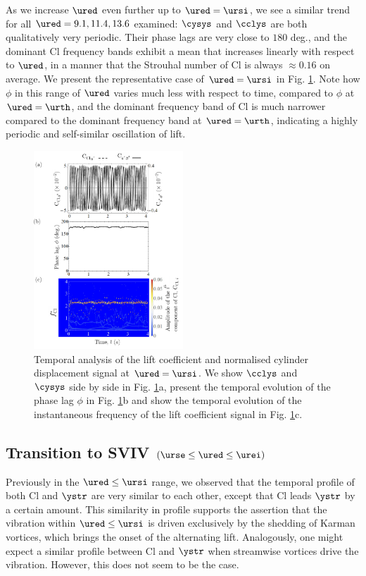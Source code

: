 \documentclass[a4paper,fleqn]{cas-sc}
\begin{document}
As we increase $\ured$ even further up to $\ured = \ursi$, we see a similar trend for all $\ured = 9.1, 11.4, 13.6$ examined: $\cysys$ and $\cclys$ are both qualitatively very periodic. Their phase lags are very close to $180$ deg., and the dominant Cl frequency bands exhibit a mean that increases linearly with respect to $\ured$, in a manner that the Strouhal number of Cl is always $\approx 0.16$ on average. We present the representative case of $\ured = \ursi$ in Fig. \ref{fig:tempAnalysisLower}. Note how $\phi$ in this range of $\ured$ varies much less with respect to time, compared to $\phi$ at $\ured = \urth$, and the dominant frequency band of Cl is much narrower compared to the dominant frequency band at $\ured = \urth$, indicating a highly periodic and self-similar oscillation of lift.

\begin{figure}
  \centering
  \includegraphics[width=0.5\textwidth]{figs/figure14}
  \caption{Temporal analysis of the lift coefficient and normalised cylinder displacement signal at $\ured = \ursi$. We show $\cclys$ and $\cysys$ side by side in Fig. \ref{fig:tempAnalysisLower}a, present the temporal evolution of the phase lag $\phi$ in Fig. \ref{fig:tempAnalysisLower}b and show the temporal evolution of the instantaneous frequency of the lift coefficient signal in Fig. \ref{fig:tempAnalysisLower}c.} \label{fig:tempAnalysisLower}
\end{figure}

\subsection{Transition to SVIV $\left (\urse \leq \ured \leq \urei \right )$} \label{ssec:transSVIV}
Previously in the $\ured \leq \ursi$ range, we observed that the temporal profile of both Cl and  $\ystr$ are very similar to each other, except that Cl leads $\ystr$ by a certain amount. This similarity in profile supports the assertion that the vibration within $\ured \leq \ursi$ is driven exclusively by the shedding of Karman vortices, which brings the onset of the alternating lift. Analogously, one might expect a similar profile between Cl and $\ystr$ when streamwise vortices drive the vibration. However, this does not seem to be the case.
\end{document}
